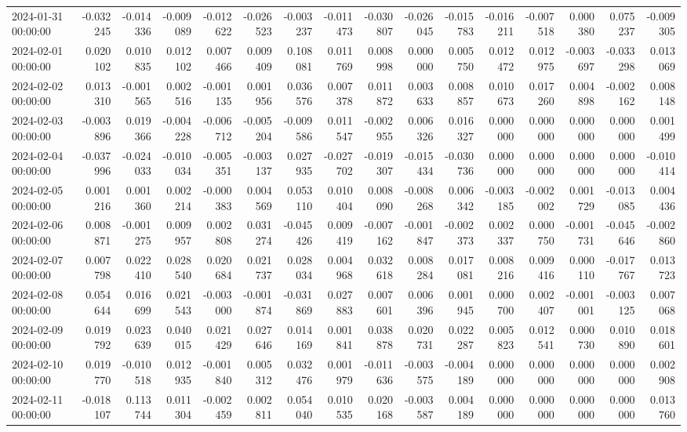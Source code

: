 \begin{tabular}{lrrrrrrrrrrrrrrr}
2024-01-31 00:00:00 & -0.032245 & -0.014336 & -0.009089 & -0.012622 & -0.026523 & -0.003237 & -0.011473 & -0.030807 & -0.026045 & -0.015783 & -0.016211 & -0.007518 & 0.000380 & 0.075237 & -0.009305 \\
2024-02-01 00:00:00 & 0.020102 & 0.010835 & 0.012102 & 0.007466 & 0.009409 & 0.108081 & 0.011769 & 0.008998 & 0.000000 & 0.005750 & 0.012472 & 0.012975 & -0.003697 & -0.033298 & 0.013069 \\
2024-02-02 00:00:00 & 0.013310 & -0.001565 & 0.002516 & -0.001135 & 0.001956 & 0.036576 & 0.007378 & 0.011872 & 0.003633 & 0.008857 & 0.010673 & 0.017260 & 0.004898 & -0.002162 & 0.008148 \\
2024-02-03 00:00:00 & -0.003896 & 0.019366 & -0.004228 & -0.006712 & -0.005204 & -0.009586 & 0.011547 & -0.002955 & 0.006326 & 0.016327 & 0.000000 & 0.000000 & 0.000000 & 0.000000 & 0.001499 \\
2024-02-04 00:00:00 & -0.037996 & -0.024033 & -0.010034 & -0.005351 & -0.003137 & 0.027935 & -0.027702 & -0.019307 & -0.015434 & -0.030736 & 0.000000 & 0.000000 & 0.000000 & 0.000000 & -0.010414 \\
2024-02-05 00:00:00 & 0.001216 & 0.001360 & 0.002214 & -0.000383 & 0.004569 & 0.053110 & 0.010404 & 0.008090 & -0.008268 & 0.006342 & -0.003185 & -0.002002 & 0.001729 & -0.013085 & 0.004436 \\
2024-02-06 00:00:00 & 0.008871 & -0.001275 & 0.009957 & 0.002808 & 0.031274 & -0.045426 & 0.009419 & -0.007162 & -0.001847 & -0.002373 & 0.002337 & 0.000750 & -0.001731 & -0.045646 & -0.002860 \\
2024-02-07 00:00:00 & 0.007798 & 0.022410 & 0.028540 & 0.020684 & 0.021737 & 0.028034 & 0.004968 & 0.032618 & 0.008284 & 0.017081 & 0.008216 & 0.009416 & 0.000110 & -0.017767 & 0.013723 \\
2024-02-08 00:00:00 & 0.054644 & 0.016699 & 0.021543 & -0.003000 & -0.001874 & -0.031869 & 0.027883 & 0.007601 & 0.006396 & 0.001945 & 0.000700 & 0.002407 & -0.001001 & -0.003125 & 0.007068 \\
2024-02-09 00:00:00 & 0.019792 & 0.023639 & 0.040015 & 0.021429 & 0.027646 & 0.014169 & 0.001841 & 0.038878 & 0.020731 & 0.022287 & 0.005823 & 0.012541 & 0.000730 & 0.010890 & 0.018601 \\
2024-02-10 00:00:00 & 0.019770 & -0.010518 & 0.012935 & -0.001840 & 0.005312 & 0.032476 & 0.001979 & -0.011636 & -0.003575 & -0.004189 & 0.000000 & 0.000000 & 0.000000 & 0.000000 & 0.002908 \\
2024-02-11 00:00:00 & -0.018107 & 0.113744 & 0.011304 & -0.002459 & 0.002811 & 0.054040 & 0.010535 & 0.020168 & -0.003587 & 0.004189 & 0.000000 & 0.000000 & 0.000000 & 0.000000 & 0.013760 \\

\end{tabular}
